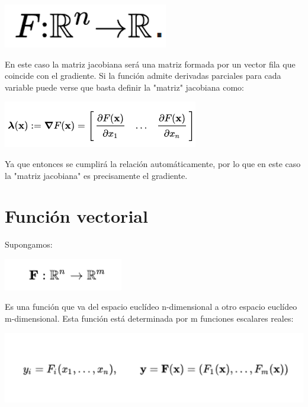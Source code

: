 \documentclass[11pt,a4paper,oldfontcommands,oneside]{memoir}
\begin{document}
\begin{center}
\includegraphics[scale=.5]{5.png} \\
\end{center}

En este caso la matriz jacobiana será una matriz formada por un vector fila que coincide con el gradiente. Si la función admite derivadas parciales para cada variable puede verse que basta definir la "matriz" jacobiana como: \\

\begin{center}
\includegraphics[scale=1]{6.png} \\
\end{center}
 
Ya que entonces se cumplirá la relación automáticamente, por lo que en este caso la "matriz jacobiana" es precisamente el gradiente. 

\section{Función vectorial}
Supongamos:

\begin{center}
\includegraphics[scale=1]{7.png}  
\end{center}

Es una función que va del espacio euclídeo n-dimensional a otro espacio euclídeo m-dimensional. Esta función está determinada por m funciones escalares reales:

\begin{center}
\includegraphics[scale=1]{8.png} 
\end{center}
\end{document}
